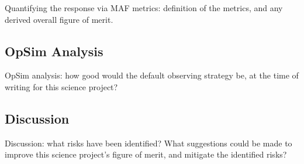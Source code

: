 Quantifying the response via MAF metrics: definition of the metrics,
and any derived overall figure of merit.



\subsection{OpSim Analysis}
\label{sec:keyword:analysis}

OpSim analysis: how good would the default observing strategy be, at
the time of writing for this science project?



\subsection{Discussion}
\label{sec:keyword:discussion}

Discussion: what risks have been identified? What suggestions could be
made to improve this science project's figure of merit, and mitigate
the identified risks?


